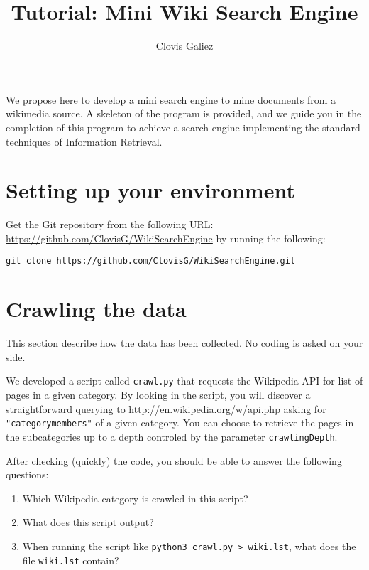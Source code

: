 \documentclass[mathserif, 11pt,c]{article}
\title{Tutorial: Mini Wiki Search Engine}
\author{Clovis Galiez}
\begin{document}
\setcounter{secnumdepth}{1} 

\newcommand{\normtwo}[1]{\left|\left|#1\right|\right|_2} 
\newcommand{\normmat}[1]{\left|\left|\left|#1\right|\right|\right|} 
\newcommand{\n}[1]{\lVert #1 \rVert} 
\newcommand{\myd}[2]{ 2\log{\dfrac{\n{#1}.\n{#2}}{#1\cdot #2}}}

\maketitle


We propose here to develop a mini search engine to mine documents from a wikimedia source. A skeleton of the program is provided, and we guide you in the completion of this program to achieve a search engine implementing the standard techniques of Information Retrieval.


\section{Setting up your environment}

Get the Git repository from the following URL: \url{https://github.com/ClovisG/WikiSearchEngine} by running the following:

\texttt{git clone https://github.com/ClovisG/WikiSearchEngine.git}




\section{Crawling the data}



This section describe how the data has been collected. No coding is asked on your side.

We developed a script called \texttt{crawl.py} that requests the Wikipedia API for list of pages in a given category. By looking in the script, you will discover a straightforward querying to \url{http://en.wikipedia.org/w/api.php} asking for \texttt{"categorymembers"} of a given category. You can choose to retrieve the pages in the subcategories up to a depth controled by the parameter \texttt{crawlingDepth}.


After checking (quickly) the code, you should be able to answer the following questions:
\begin{enumerate}[label=\textbf{Q\thesection.\arabic*}]
	\item Which Wikipedia category is crawled in this script?
	\item What does this script output?
	\item When running the script like \texttt{python3 crawl.py > wiki.lst}, what does the file \texttt{wiki.lst} contain?
\end{enumerate}
\end{document}
